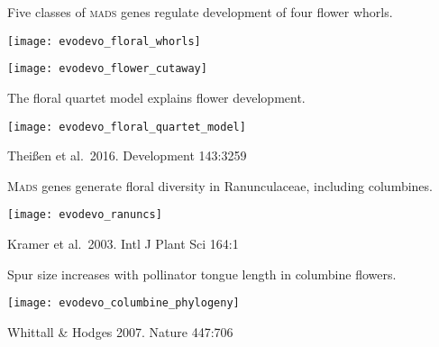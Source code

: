 \documentclass[t,handout]{beamer}  %
\newcommand{\futuyma}[1]{%
	\ifthenelse{\isempty{#1}}%
	{Futuyma \& Kirkpatrick 2017, 4th ed.}%
	{Fig.~#1~Futuyma \& Kirkpatrick 2017, 4th ed.}%
}
\newcommand{\backskip}{\vspace{-0.5\baselineskip}}
\begin{document}
{
\begin{frame}[b]

\end{frame}
}

\begin{frame}{Five classes of \textsc{mads} genes regulate development of four flower whorls.}

\vspace{-\baselineskip}

\centering
\texttt{[image: evodevo\_floral\_whorls]}

\texttt{[image: evodevo\_flower\_cutaway]}

\end{frame}

\begin{frame}{The floral quartet model explains flower development.}

\backskip

\centering

\texttt{[image: evodevo\_floral\_quartet\_model]}

\tinyfill Theißen et al.~2016. Development 143:3259

\end{frame}

\begin{frame}{M\textsc{ads} genes generate floral diversity in Ranunculaceae, including columbines.}

\backskip

\centering

\texttt{[image: evodevo\_ranuncs]}

\tinyfill Kramer et al.~2003. Intl J Plant Sci 164:1  

\end{frame}

\begin{frame}{Spur size increases with pollinator tongue length in columbine flowers.}
\backskip

\centering

\texttt{[image: evodevo\_columbine\_phylogeny]}

\tinyfill Whittall \& Hodges 2007. Nature 447:706  

\end{frame}
\end{document}
